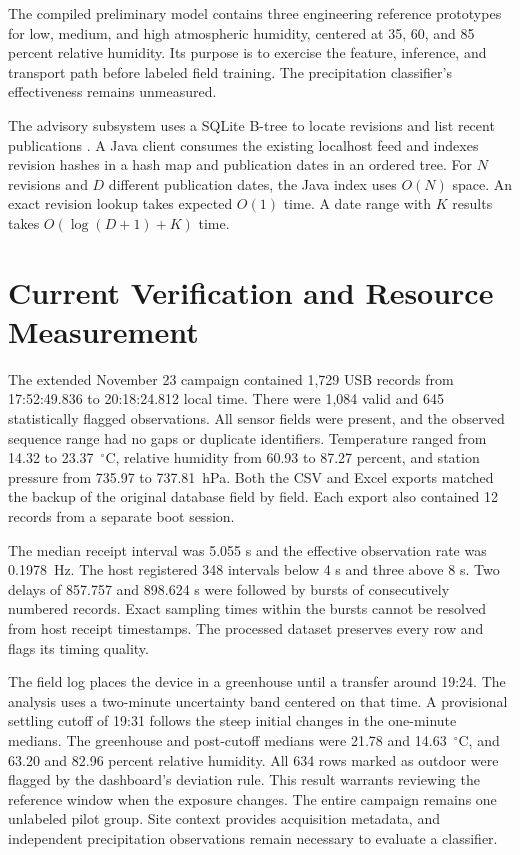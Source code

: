 \documentclass[conference]{IEEEtran}
\begin{document}
The compiled preliminary model contains three engineering reference prototypes for low, medium, and high atmospheric humidity, centered at 35, 60, and 85 percent relative humidity. Its purpose is to exercise the feature, inference, and transport path before labeled field training. The precipitation classifier's effectiveness remains unmeasured.

The advisory subsystem uses a SQLite B-tree to locate revisions and list recent publications \cite{sqlite}. A Java client consumes the existing localhost feed and indexes revision hashes in a hash map and publication dates in an ordered tree. For $N$ revisions and $D$ different publication dates, the Java index uses $O(N)$ space. An exact revision lookup takes expected $O(1)$ time. A date range with $K$ results takes $O(\log(D+1)+K)$ time.

\section{Current Verification and Resource Measurement}
The extended November 23 campaign contained 1,729 USB records from 17:52:49.836 to 20:18:24.812 local time. There were 1,084 valid and 645 statistically flagged observations. All sensor fields were present, and the observed sequence range had no gaps or duplicate identifiers. Temperature ranged from 14.32 to 23.37~$^{\circ}$C, relative humidity from 60.93 to 87.27 percent, and station pressure from 735.97 to 737.81~hPa. Both the CSV and Excel exports matched the backup of the original database field by field. Each export also contained 12 records from a separate boot session.

The median receipt interval was 5.055 s and the effective observation rate was 0.1978~Hz. The host registered 348 intervals below 4 s and three above 8 s. Two delays of 857.757 and 898.624 s were followed by bursts of consecutively numbered records. Exact sampling times within the bursts cannot be resolved from host receipt timestamps. The processed dataset preserves every row and flags its timing quality.

The field log places the device in a greenhouse until a transfer around 19:24. The analysis uses a two-minute uncertainty band centered on that time. A provisional settling cutoff of 19:31 follows the steep initial changes in the one-minute medians. The greenhouse and post-cutoff medians were 21.78 and 14.63~$^{\circ}$C, and 63.20 and 82.96 percent relative humidity. All 634 rows marked as outdoor were flagged by the dashboard's deviation rule. This result warrants reviewing the reference window when the exposure changes. The entire campaign remains one unlabeled pilot group. Site context provides acquisition metadata, and independent precipitation observations remain necessary to evaluate a classifier.
\end{document}
